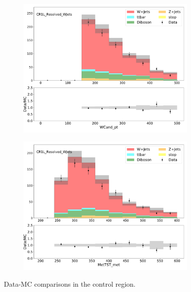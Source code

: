 \begin{figure}[htbp]
\begin{subfigure}{0.49\textwidth}
     \includegraphics[width = 0.98\textwidth]{Figures/4/datamc/CR1L_Resolved_WJets/WCand_pt.pdf}
     \caption{\Wcandpt}
     \end{subfigure}
     \begin{subfigure}{0.49\textwidth}
     \includegraphics[width = 0.98\textwidth]{Figures/4/datamc/CR1L_Resolved_WJets/MetTST_met.pdf}
     \caption{\met}
     \end{subfigure}

     \caption{Data-MC comparisons in the \resolved \wjets control region.}
     \label{fig:Data_MC_CRdR_resolved}
  \end{figure}

\FloatBarrier


